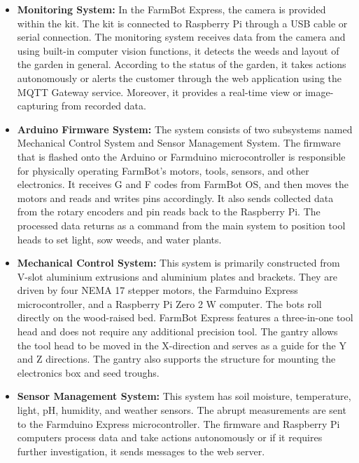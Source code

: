 \begin{itemize}
    \item \textbf{Monitoring System:} In the FarmBot Express, the camera is provided within the kit. The kit is connected to Raspberry Pi through a USB cable or serial connection. The monitoring system receives data from the camera and using built-in computer vision functions, it detects the weeds and layout of the garden in general. According to the status of the garden, it takes actions autonomously or alerts the customer through the web application using the MQTT Gateway service. Moreover, it provides a real-time view or image-capturing from recorded data.
    
    \item \textbf{Arduino Firmware System:} The system consists of two subsystems named Mechanical Control System and Sensor Management System. The firmware that is flashed onto the Arduino or Farmduino microcontroller is responsible for physically operating FarmBot’s motors, tools, sensors, and other electronics. It receives G and F codes from FarmBot OS, and then moves the motors and reads and writes pins accordingly. It also sends collected data from the rotary encoders and pin reads back to the Raspberry Pi. The processed data returns as a command from the main system to position tool heads to set light, sow weeds, and water plants.

    \item \textbf{Mechanical Control System:} This system is primarily constructed from V-slot aluminium extrusions and aluminium plates and brackets. They are driven by four NEMA 17 stepper motors, the Farmduino Express microcontroller, and a Raspberry Pi Zero 2 W computer.
    The bots roll directly on the wood-raised bed. FarmBot Express features a three-in-one tool head and does not require any additional precision tool. The gantry allows the tool head to be moved in the X-direction and serves as a guide for the Y and Z directions. The gantry also supports the structure for mounting the electronics box and seed troughs.
    
    \item \textbf{Sensor Management System:} This system has soil moisture, temperature, light, pH, humidity, and weather sensors. The abrupt measurements are sent to the Farmduino Express microcontroller. The firmware and Raspberry Pi computers process data and take actions autonomously
    or if it requires further investigation, it sends messages to the web server.


\end{itemize}
